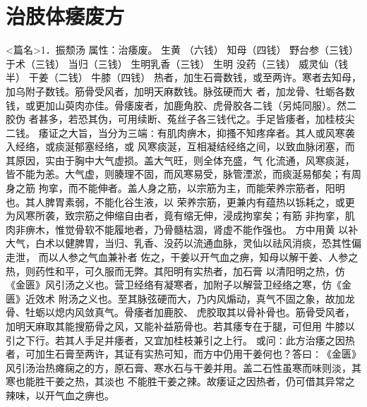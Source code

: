 \documentclass[a4paper,12pt,UTF8,twoside]{ctexbook}
\begin{document}
\chapter{治肢体痿废方}
<篇名>1．振颓汤
属性：治痿废。 
生黄 （六钱） 知母（四钱） 野台参（三钱） 于术（三钱） 当归（三钱） 生明乳香（三钱） 生明 
没药（三钱） 威灵仙（钱半） 干姜（二钱） 牛膝（四钱） 
热者，加生石膏数钱，或至两许。寒者去知母，加乌附子数钱。筋骨受风者，加明天麻数钱。脉弦硬而大 
者，加龙骨、牡蛎各数钱，或更加山萸肉亦佳。骨痿废者，加鹿角胶、虎骨胶各二钱（另炖同服）。然二胶伪 
者甚多，若恐其伪，可用续断、菟丝子各三钱代之。手足皆痿者，加桂枝尖二钱。 
痿证之大旨，当分为三端∶有肌肉痹木，抑搔不知疼痒者。其人或风寒袭入经络，或痰涎郁塞经络，或 
风寒痰涎，互相凝结经络之间，以致血脉闭塞，而其原因，实由于胸中大气虚损。盖大气旺，则全体充盛，气 
化流通，风寒痰涎，皆不能为恙。大气虚，则腠理不固，而风寒易受，脉管湮淤，而痰涎易郁矣；有周身之筋 
拘挛，而不能伸者。盖人身之筋，以宗筋为主，而能荣养宗筋者，阳明也。其人脾胃素弱，不能化谷生液，以 
荣养宗筋，更兼内有蕴热以铄耗之，或更为风寒所袭，致宗筋之伸缩自由者，竟有缩无伸，浸成拘挛矣；有筋 
非拘挛，肌肉非痹木，惟觉骨软不能履地者，乃骨髓枯涸，肾虚不能作强也。 
方中用黄 以补大气，白术以健脾胃，当归、乳香、没药以流通血脉，灵仙以祛风消痰，恐其性偏走泄， 
而以人参之气血兼补者 
佐之，干姜以开气血之痹，知母以解干姜、人参之热，则药性和平，可久服而无弊。其阳明有实热者，加石膏 
以清阳明之热，仿《金匮》风引汤之义也。营卫经络有凝寒者，加附子以解营卫经络之寒，仿《金匮》近效术 
附汤之义也。至其脉弦硬而大，乃内风煽动，真气不固之象，故加龙骨、牡蛎以熄内风敛真气。骨痿者加鹿胶、 
虎胶取其以骨补骨也。筋骨受风者，加明天麻取其能搜筋骨之风，又能补益筋骨也。若其痿专在于腿，可但用 
牛膝以引之下行。若其人手足并痿者，又宜加桂枝兼引之上行。 
或问∶此方治痿之因热者，可加生石膏至两许，其证有实热可知，而方中仍用干姜何也？答曰∶《金匮》 
风引汤治热瘫痫之的方，原石膏、寒水石与干姜并用。盖二石性虽寒而味则淡，其寒也能胜干姜之热，其淡也 
不能胜干姜之辣。故痿证之因热者，仍可借其异常之辣味，以开气血之痹也。 
\end{document}
